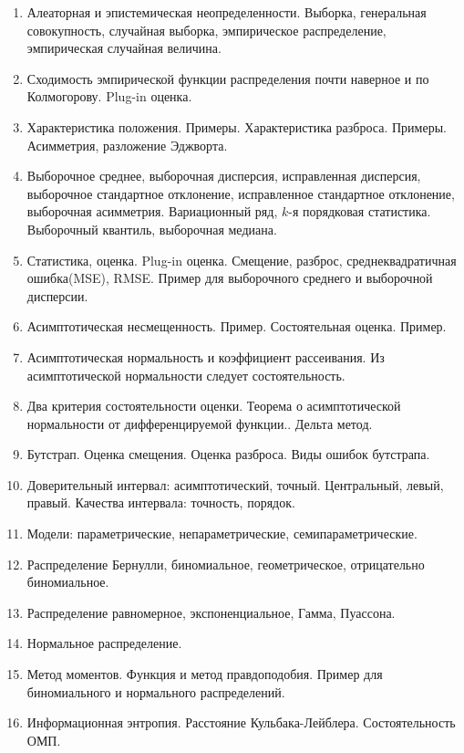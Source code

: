 
\begin{enumerate}
	\item Алеаторная и эпистемическая неопределенности. Выборка, генеральная совокупность, случайная выборка, эмпирическое распределение, эмпирическая случайная величина.
	\item Сходимость эмпирической функции распределения почти наверное и по Колмогорову. Plug-in оценка.
	\item Характеристика положения. Примеры. Характеристика разброса. Примеры. Асимметрия, разложение Эджворта.
	\item Выборочное среднее, выборочная дисперсия, исправленная дисперсия, выборочное стандартное отклонение, исправленное стандартное отклонение, выборочная асимметрия. Вариационный ряд, $k$-я порядковая статистика. Выборочный квантиль, выборочная медиана.
	\item Статистика, оценка. Plug-in оценка. Смещение, разброс, среднеквадратичная ошибка(MSE), RMSE. Пример для выборочного среднего и выборочной дисперсии.
	\item Асимптотическая несмещенность. Пример. Состоятельная оценка. Пример. 
	\item Асимптотическая нормальность и коэффициент рассеивания. Из асимптотической нормальности следует состоятельность.
	\item Два критерия состоятельности оценки. Теорема о асимптотической нормальности от дифференцируемой функции.. Дельта метод.
	\item Бутстрап. Оценка смещения. Оценка разброса. Виды ошибок бутстрапа.
	\item Доверительный интервал: асимптотический, точный. Центральный, левый, правый. Качества интервала: точность, порядок.
	\item Модели: параметрические, непараметрические, семипараметрические. 
	\item Распределение Бернулли, биномиальное, геометрическое, отрицательно биномиальное.
	\item Распределение равномерное, экспоненциальное, Гамма, Пуассона.
	\item Нормальное распределение.
	\item Метод моментов. Функция и метод правдоподобия. Пример для биномиального и нормального распределений.
	\item Информационная энтропия. Расстояние Кульбака-Лейблера. Состоятельность ОМП.


\end{enumerate}
